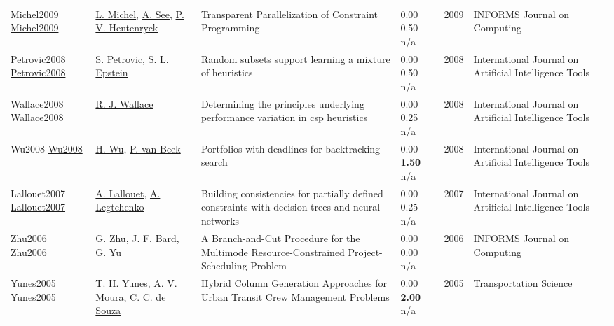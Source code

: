 {\begin{longtable}{p{3cm}p{5cm}p{10cm}p{1cm}rp{2.5cm}l}
Michel2009 \href{http://dx.doi.org/10.1287/ijoc.1080.0313}{Michel2009} & \hyperref[auth:a32]{L. Michel}, \hyperref[auth:a1804]{A. See}, \hyperref[auth:a148]{P. V. Hentenryck} & Transparent Parallelization of Constraint Programming & \noindent{}\textcolor{black!50}{0.00} 0.50 n/a & 2009 & \cellcolor{red!20}INFORMS Journal on Computing & \cite{Michel2009}\\
Petrovic2008 \href{http://dx.doi.org/10.1142/s0218213008004023}{Petrovic2008} & \hyperref[auth:a1858]{S. Petrovic}, \hyperref[auth:a1859]{S. L. Epstein} & \cellcolor{green!10}Random subsets support learning a mixture of heuristics & \noindent{}\textcolor{black!50}{0.00} 0.50 n/a & 2008 & International Journal on Artificial Intelligence Tools & \cite{Petrovic2008}\\
Wallace2008 \href{http://dx.doi.org/10.1142/s0218213008004199}{Wallace2008} & \hyperref[auth:a1267]{R. J. Wallace} & Determining the principles underlying performance variation in csp heuristics & \noindent{}\textcolor{black!50}{0.00} 0.25 n/a & 2008 & International Journal on Artificial Intelligence Tools & \cite{Wallace2008}\\
Wu2008 \href{http://dx.doi.org/10.1142/s0218213008004187}{Wu2008} & \hyperref[auth:a2057]{H. Wu}, \hyperref[auth:a609]{P. van Beek} & Portfolios with deadlines for backtracking search & \noindent{}\textcolor{black!50}{0.00} \textbf{1.50} n/a & 2008 & International Journal on Artificial Intelligence Tools & \cite{Wu2008}\\
Lallouet2007 \href{http://dx.doi.org/10.1142/s0218213007003503}{Lallouet2007} & \hyperref[auth:a427]{A. Lallouet}, \hyperref[auth:a1932]{A. Legtchenko} & Building consistencies for partially defined constraints with decision trees and neural networks & \noindent{}\textcolor{black!50}{0.00} 0.25 n/a & 2007 & International Journal on Artificial Intelligence Tools & \cite{Lallouet2007}\\
Zhu2006 \href{http://dx.doi.org/10.1287/ijoc.1040.0121}{Zhu2006} & \hyperref[auth:a1526]{G. Zhu}, \hyperref[auth:a1527]{J. F. Bard}, \hyperref[auth:a1528]{G. Yu} & A Branch-and-Cut Procedure for the Multimode Resource-Constrained Project-Scheduling Problem & \noindent{}\textcolor{black!50}{0.00} \textcolor{black!50}{0.00} n/a & 2006 & \cellcolor{red!20}INFORMS Journal on Computing & \cite{Zhu2006}\\
Yunes2005 \href{http://dx.doi.org/10.1287/trsc.1030.0078}{Yunes2005} & \hyperref[auth:a941]{T. H. Yunes}, \hyperref[auth:a1578]{A. V. Moura}, \hyperref[auth:a170]{C. C. de Souza} & Hybrid Column Generation Approaches for Urban Transit Crew Management Problems & \noindent{}\textcolor{black!50}{0.00} \textbf{2.00} n/a & 2005 & \cellcolor{red!20}Transportation Science & \cite{Yunes2005}\\

\end{longtable}}

